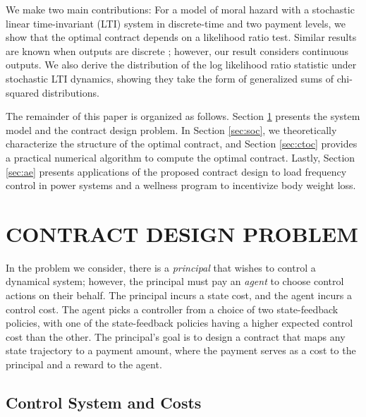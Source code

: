 \documentclass[letterpaper, 10 pt, conference]{ieeeconf}  %
\begin{document}
We make two main contributions: For a model of moral hazard with a stochastic linear time-invariant (LTI) system in discrete-time and two payment levels, we show that the optimal contract depends on a likelihood ratio test. Similar results are known when outputs are discrete \cite{Laffont,saig2023delegated}; however, our result  considers continuous outputs. We also derive the distribution of the log likelihood ratio statistic under stochastic LTI dynamics, showing they take the form of generalized sums of chi-squared distributions.

The remainder of this paper is organized as follows. Section \ref{sec:cdp} presents the system model and the contract design problem. In Section \ref{sec:soc}, we theoretically characterize the structure of the optimal contract, and Section \ref{sec:ctoc} provides a practical numerical algorithm to compute the optimal contract. Lastly, Section \ref{sec:ae} presents applications of the proposed contract design to load frequency control in power systems and a wellness program to incentivize body weight loss.


\section{CONTRACT DESIGN PROBLEM}
\label{sec:cdp}
In the problem we consider, there is a \emph{principal} that wishes to control a dynamical system; however, the principal must pay an \emph{agent} to choose control actions on their behalf. The principal incurs a state cost, and the agent incurs a control cost. The agent picks a controller from a choice of two state-feedback policies, with one of the state-feedback policies having a higher expected control cost than the other. The principal's goal is to design a contract that maps any state trajectory to a payment amount, where the payment serves as a cost to the principal and a reward to the agent. %

\subsection{Control System and Costs}
\end{document}
